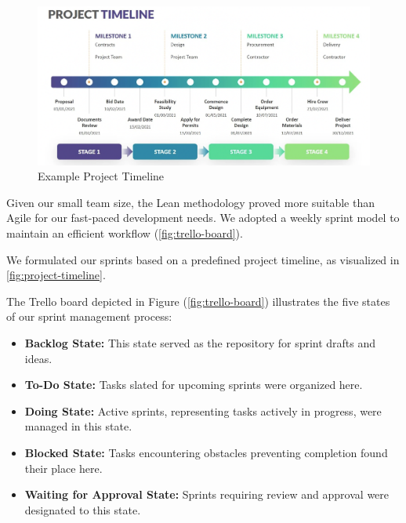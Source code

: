 \documentclass[12pt,a4paper]{article}
\begin{document}
\begin{spacing}{1.5}
    \begin{figure}[H]
        \centering
        \includegraphics[width=16cm]{assets/project-timeline-example.png}
        \caption{Example Project Timeline}
        \label{fig:project-timeline}
    \end{figure}
    \FloatBarrier

    Given our small team size, the Lean methodology proved more suitable than Agile
    for our fast-paced development needs. We adopted a weekly sprint model to
    maintain an efficient workflow (\autoref{fig:trello-board}).

    We formulated our sprints based on a predefined project timeline, as visualized
    in \autoref{fig:project-timeline}.

    The Trello board depicted in Figure (\autoref{fig:trello-board}) illustrates
    the five states of our sprint management process:
    \begin{itemize}
        \item \textbf{Backlog State:}
              This state served as the repository for sprint drafts and ideas.

        \item \textbf{To-Do State:}
              Tasks slated for upcoming sprints were organized here.

        \item \textbf{Doing State:}
              Active sprints, representing tasks actively in progress, were managed in this state.

        \item \textbf{Blocked State:}
              Tasks encountering obstacles preventing completion found their place here.

        \item \textbf{Waiting for Approval State:}
              Sprints requiring review and approval were designated to this state.


\end{itemize}
\end{spacing}
\end{document}
